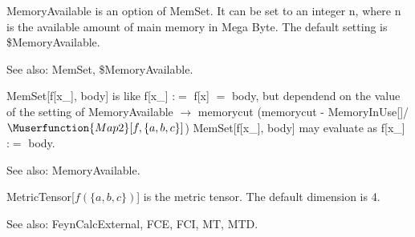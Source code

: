 



MemoryAvailable is an option of MemSet. It can be set to an integer n, where n is the available amount of main memory in Mega Byte. The
  default setting is \${}MemoryAvailable.

See also:  MemSet, \${}MemoryAvailable.



MemSet[f[x\_{}], body] is like f[x\_{}] :\(=\) f[x] \(=\) body, but dependend on the value of the setting of MemoryAvailable
  \(\rightarrow \) memorycut (memorycut - MemoryInUse[]/\(\Muserfunction{Map2}[f,\{a,b,c\}]\)) MemSet[f[x\_{}], body] may evaluate as f[x\_{}] :\(=\)
body.

See also:  MemoryAvailable.



MetricTensor[\(f(\{a,b,c\})\)] is the metric tensor. The default dimension is 4.

See also:  FeynCalcExternal, FCE, FCI, MT, MTD.





\dispSFoutmath{
\mu ,\multsp \nu
}










